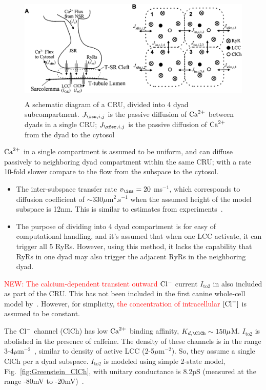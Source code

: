 \begin{figure}[hbt]
  \centerline{\includegraphics[height=5cm,
    angle=0]{./images/Greenstein_2002_CRU.eps}}
  \caption{A schematic diagram of a CRU, divided into 4 dyad
    subcompartment. $J_{\iss,i,j}$ is the passive diffusion of ${\text{Ca}^{2+}}$
    between dyads in a single CRU; $J_{\xfer,i,j}$ is the passive
    diffusion of ${\text{Ca}^{2+}}$ from the dyad to the cytosol}
\label{fig:Greenstein_CRU}
\end{figure}

${\text{Ca}^{2+}}$ in a single compartment is assumed to be uniform, and can
diffuse passively to neighboring dyad compartment within the same
CRU; with a rate 10-fold slower compare to the flow from the subspace
to the cytosol. 
\begin{itemize}
\item The inter-subspace transfer rate $v_\iss = 20$ ms$^{-1}$, which
  corresponds to diffusion coefficient of $\sim 330\mu$m$^2$.s$^{-1}$
  when the assumed height of the model subspace is 12nm. This is
  similar to estimates from experiments~\citep{soeller1997}.

\item The purpose of dividing into 4 dyad compartment is for easy of
  computational handling, and it's assumed that when one LCC activate, it can
  trigger all 5 RyRs. However, using this method, it lacks the capability that
  RyRs in one dyad may also trigger the adjacent RyRs in the neighboring dyad.
\end{itemize}

\textcolor{red}{NEW: The calcium-dependent transient outward} $\ce{Cl-}$
  current $I_\text{to2}$ in also included as part of the CRU.
  This has not been included in the first canine whole-cell model by~\citep{winslow1999}. However,
  for simplicity,
\textcolor{red}{the concentration of intracellular} $[{\text{Cl}^{-}}]$ is assumed
  to be constant.

\label{sec:Cl-channel}
The $\ce{Cl-}$ channel (ClCh) has low ${\text{Ca}^{2+}}$ binding affinity, $K_{d,\ClCh}\sim
150\mu$M. $I_\text{to2}$ is abolished in the presence of caffeine. The density
of these channels is in the range 3-4$\mu$m$^{-2}$~\citep{collier1999}, similar
to density of active LCC (2-5$\mu$m$^{-2}$). So, they assume a single ClCh per a
dyad subspace. $I_\text{to2}$ is modeled using simple 2-state model,
Fig.~\ref{fig:Greenstein_ClCh}, with unitary conductance is 8.2pS (measured at
the range -80mV to -20mV)~\citep{collier1999}.

